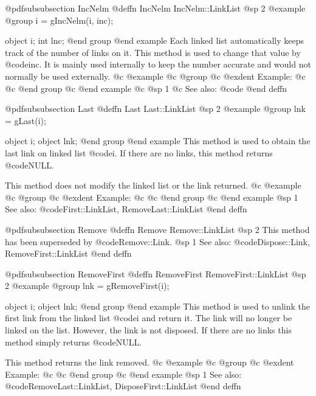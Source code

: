 @pdfsubsubsection {IncNelm}
@deffn {IncNelm} IncNelm::LinkList
@sp 2
@example
@group
i = gIncNelm(i, inc);

object  i;
int     lnc;
@end group
@end example
Each linked list automatically keeps track of the number of links on it.
This method is used to change that value by @code{inc}.  It is mainly
used internally to keep the number accurate and would not normally be
used externally.
@c @example
@c @group
@c @exdent Example:
@c 
@c @end group
@c @end example
@c @sp 1
@c See also:  @code{}
@end deffn















@pdfsubsubsection {Last}
@deffn {Last} Last::LinkList
@sp 2
@example
@group
lnk = gLast(i);

object  i;
object  lnk;
@end group
@end example
This method is used to obtain the last link on linked list @code{i}.
If there are no links, this method returns @code{NULL}.

This method does not modify the linked list or the link returned.
@c @example
@c @group
@c @exdent Example:
@c 
@c @end group
@c @end example
@sp 1
See also:  @code{First::LinkList, RemoveLast::LinkList}
@end deffn













@pdfsubsubsection {Remove}
@deffn {Remove} Remove::LinkList
@sp 2
This method has been superseded by @code{Remove::Link}.
@sp 1
See also:  @code{Dispose::Link, RemoveFirst::LinkList}
@end deffn








@pdfsubsubsection {RemoveFirst}
@deffn {RemoveFirst} RemoveFirst::LinkList
@sp 2
@example
@group
lnk = gRemoveFirst(i);

object  i;
object  lnk;
@end group
@end example
This method is used to unlink the first link from the linked list
@code{i} and return it.  The link will no longer be linked on the list.
However, the link is not disposed.  If there are no links this method
simply returns @code{NULL}.

This method returns the link removed.
@c @example
@c @group
@c @exdent Example:
@c 
@c @end group
@c @end example
@sp 1
See also:  @code{RemoveLast::LinkList, DisposeFirst::LinkList}
@end deffn











